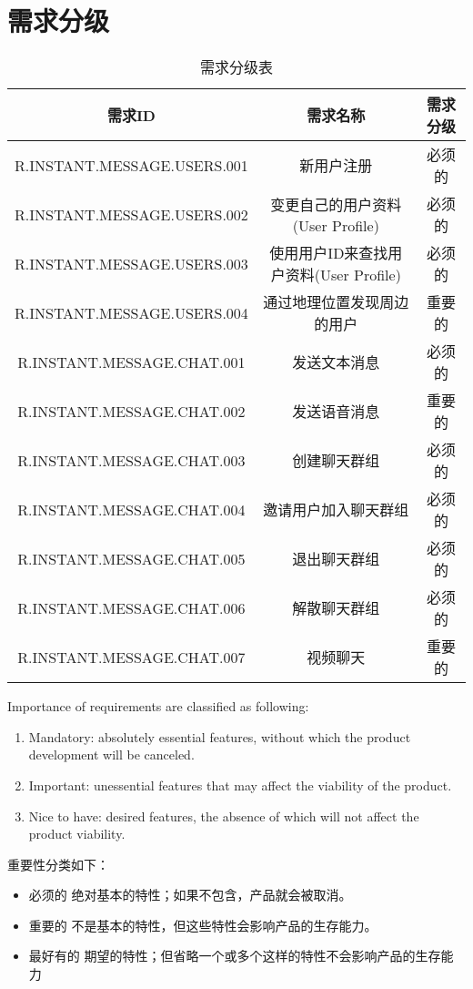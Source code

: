 \chapter{需求分级}
\begin{table}[htbp]
\centering
\caption{需求分级表} \label{tab:classification}
\begin{tabular}{|c|c|c|}
    \hline
    需求ID & 需求名称 & 需求分级 \\
    \hline
    R.INSTANT.MESSAGE.USERS.001 & 新用户注册 & 必须的 \\
    \hline
    R.INSTANT.MESSAGE.USERS.002 & 变更自己的用户资料(User Profile) & 必须的 \\
    \hline
    R.INSTANT.MESSAGE.USERS.003 & 使用用户ID来查找用户资料(User Profile) & 必须的 \\
    \hline
    R.INSTANT.MESSAGE.USERS.004 & 通过地理位置发现周边的用户 & 重要的 \\
    \hline
    R.INSTANT.MESSAGE.CHAT.001 & 发送文本消息 & 必须的 \\
    \hline
    R.INSTANT.MESSAGE.CHAT.002 & 发送语音消息 & 重要的 \\
    \hline
    R.INSTANT.MESSAGE.CHAT.003 & 创建聊天群组 & 必须的 \\
    \hline
    R.INSTANT.MESSAGE.CHAT.004 & 邀请用户加入聊天群组 & 必须的 \\
    \hline
    R.INSTANT.MESSAGE.CHAT.005 & 退出聊天群组 & 必须的 \\
    \hline
    R.INSTANT.MESSAGE.CHAT.006 & 解散聊天群组 & 必须的 \\
    \hline
    R.INSTANT.MESSAGE.CHAT.007 & 视频聊天 & 重要的 \\
    \hline
\end{tabular}
\end{table}

Importance of requirements are classified as following:
\begin{enumerate}
\item Mandatory: absolutely essential features, without which the product development will be canceled.
\item Important: unessential features that may affect the viability of the product.
\item Nice to have: desired features, the absence of which will not affect the product viability.
\end{enumerate}

重要性分类如下：
\begin{itemize}
\item 必须的		绝对基本的特性；如果不包含，产品就会被取消。
\item 重要的		不是基本的特性，但这些特性会影响产品的生存能力。
\item 最好有的		期望的特性；但省略一个或多个这样的特性不会影响产品的生存能力
\end{itemize}
